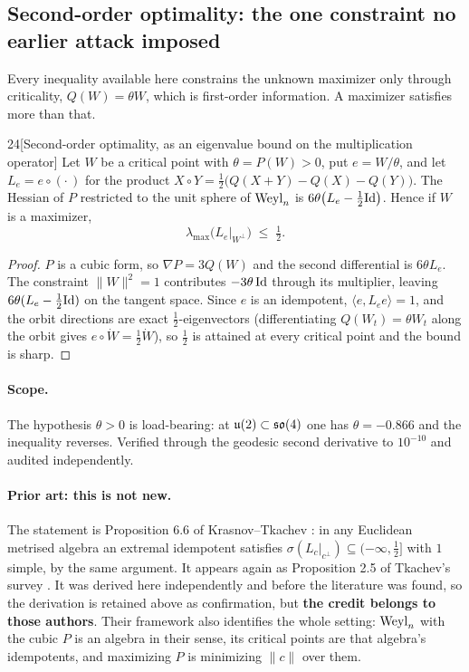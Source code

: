 \subsection{Second-order optimality: the one constraint no earlier attack imposed}\label{sec:secondorder}

Every inequality available here constrains the unknown maximizer only through criticality, $Q(W)=\theta W$, which is first-order information. A maximizer satisfies more than that.

\begin{Lem}{24}[Second-order optimality, as an eigenvalue bound on the multiplication operator]
Let $W$ be a critical point with $\theta=P(W)>0$, put $e=W/\theta$, and let $L_e=e\circ(\cdot\,)$ for the product $X\circ Y=\tfrac12\big(Q(X+Y)-Q(X)-Q(Y)\big)$. The Hessian of $P$ restricted to the unit sphere of $\mathrm{Weyl}_n$ is $6\theta\big(L_e-\tfrac12\mathrm{Id}\big)$. Hence if $W$ is a maximizer,
\[
\lambda_{\max}\big(L_e|_{W^\perp}\big)\;\le\;\tfrac12 .
\]
\end{Lem}

\begin{proof}
$P$ is a cubic form, so $\nabla P=3Q(W)$ and the second differential is $6\theta L_e$. The constraint $\|W\|^2=1$ contributes $-3\theta\,\mathrm{Id}$ through its multiplier, leaving $6\theta(L_e-\tfrac12\mathrm{Id})$ on the tangent space. Since $e$ is an idempotent, $\langle e,L_ee\rangle=1$, and the orbit directions are exact $\tfrac12$-eigenvectors (differentiating $Q(W_t)=\theta W_t$ along the orbit gives $e\circ\dot W=\tfrac12\dot W$), so $\tfrac12$ is attained at every critical point and the bound is sharp.
\end{proof}

\paragraph{Scope.} The hypothesis $\theta>0$ is load-bearing: at $\mathfrak{u}(2)\subset\mathfrak{so}(4)$ one has $\theta=-0.866$ and the inequality reverses. Verified through the geodesic second derivative to $10^{-10}$ and audited independently.

\paragraph{Prior art: this is not new.} The statement is Proposition 6.6 of Krasnov--Tkachev \cite{kt2018}: in any Euclidean metrised algebra an extremal idempotent satisfies $\sigma(L_c|_{c^\perp})\subseteq(-\infty,\tfrac12]$ with $1$ simple, by the same argument. It appears again as Proposition 2.5 of Tkachev's survey \cite{tkachev2019}. It was derived here independently and before the literature was found, so the derivation is retained above as confirmation, but \textbf{the credit belongs to those authors}. Their framework also identifies the whole setting: $\mathrm{Weyl}_n$ with the cubic $P$ is an algebra in their sense, its critical points are that algebra's idempotents, and maximizing $P$ is minimizing $\|c\|$ over them.

